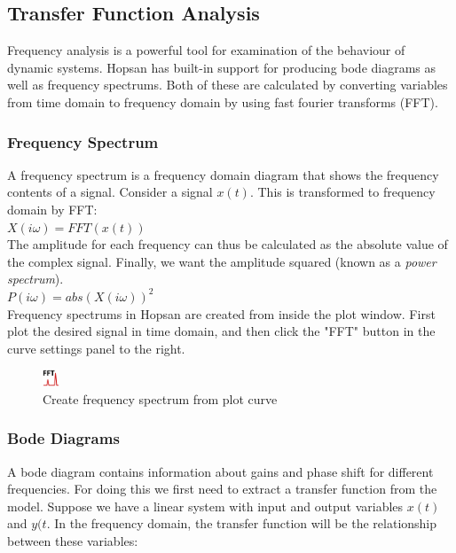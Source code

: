
\subsection{Transfer Function Analysis}
Frequency analysis is a powerful tool for examination of the behaviour of dynamic systems. Hopsan has built-in support for producing bode diagrams as well as frequency spectrums. Both of these are calculated by converting variables from time domain to frequency domain by using fast fourier transforms (FFT).

\subsubsection{Frequency Spectrum}
A frequency spectrum is a frequency domain diagram that shows the frequency contents of a signal. Consider a signal $x(t)$. This is transformed to frequency domain by FFT:\\

$X(i\omega)=FFT(x(t))$\\

The amplitude for each frequency can thus be calculated as the absolute value of the complex signal. Finally, we want the amplitude squared (known as a \textit{power spectrum}).\\

$P(i\omega)=abs(X(i\omega))^2$\\

Frequency spectrums in Hopsan are created from inside the plot window. First plot the desired signal in time domain, and then click the "FFT" button in the curve settings panel to the right.


\begin{figure}
  \includegraphics[width=5mm]
    {../../HopsanGUI/graphics/uiicons/Hopsan-FrequencyAnalysis.png}%
  \caption*{Create frequency spectrum from plot curve}
\end{figure} 
\subsubsection{Bode Diagrams}
A bode diagram contains information about gains and phase shift for different frequencies. For doing this we first need to extract a transfer function from the model. Suppose we have a linear system with input and output variables $x(t)$ and $y(t$. In the frequency domain, the transfer function will be the relationship between these variables:\\

